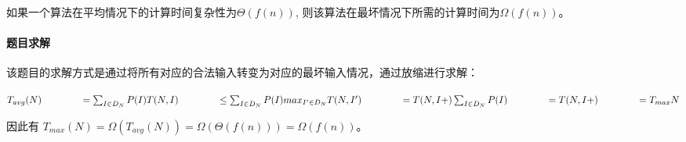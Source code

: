 \documentclass[UTF8]{ctexart}
\begin{document}
    如果一个算法在平均情况下的计算时间复杂性为$\Theta (f(n))$, 则该算法在最坏情况下所需的计算时间为$\Omega (f(n))$。

    \paragraph{题目求解}

    该题目的求解方式是通过将所有对应的合法输入转变为对应的最坏输入情况，通过放缩进行求解：

    $T_{avg}(N) \\ \qquad \qquad = \sum_{I \in D_N} P(I) T(N,I) \\ \qquad \qquad \leq  \sum_{I \in D_N} P(I) max _{I' \in D_N} T(N, I') \\ \qquad \qquad = T(N, I+) \sum_{I \in D_N} P(I) \\ \qquad \qquad = T(N, I+) \\ \qquad \qquad = T_{max} {N}$

    因此有 $T_{max}(N) = \Omega (T_{avg}(N)) = \Omega (\Theta (f(n))) = \Omega (f(n))$。
\end{document}

